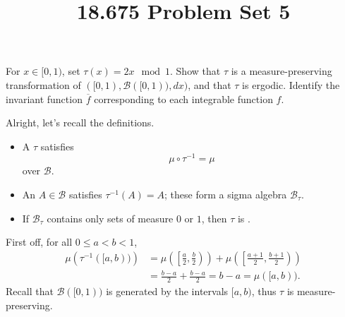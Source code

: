 \documentclass[11pt, headheight=30pt]{scrartcl}
\title{18.675 Problem Set 5}
\newcommand{\BBB}{\mathscr{B}}
\begin{document}
\section{}
\begin{prob*}
    For $x \in [0, 1)$, set $\tau(x) = 2x \mod 1$.
    Show that $\tau$ is a measure-preserving
    transformation of $([0, 1), \BBB([0, 1)), dx)$, and that
    $\tau$ is ergodic. Identify the invariant function
    $\overline{f}$ corresponding to each integrable function $f$.
\end{prob*}

Alright, let's recall the definitions.
\begin{itemize}
    \item A  $\tau$ satisfies
    \[
        \mu \circ \tau^{-1} = \mu
    \]
    over $\BBB$.
    \item An  $A \in \BBB$ satisfies $\tau^{-1}(A) = A$;
    these form a sigma algebra $\BBB_\tau$.
    \item If $\BBB_\tau$ contains only sets of measure $0$ or $1$,
    then $\tau$ is .
\end{itemize}

First off, for all $0\leq a < b < 1$,
\begin{align*}
    \mu\left(\tau^{-1}([a,b))\right) &= \mu\left(\left[\frac{a}{2}, \frac{b}{2}\right)\right) + \mu\left(\left[\frac{a+1}{2}, \frac{b+1}{2}\right)\right) \\
    &= \frac{b-a}{2} + \frac{b-a}{2}= b-a = \mu([a,b)).
\end{align*}
Recall that $\BBB([0,1))$ is generated by the intervals $[a,b)$,
thus $\tau$ is measure-preserving.
\end{document}
